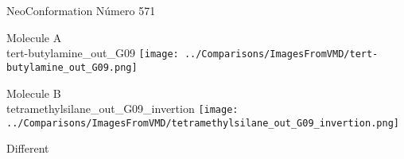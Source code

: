  \newpage

\vtab[-3cm]
\begin{center}
{\large NeoConformation \tab Número 571}
\end{center}
\begin{multicols}{2}
\begin{center}
Molecule A \\ 
tert-butylamine\_out\_G09
\texttt{[image: ../Comparisons/ImagesFromVMD/tert-butylamine\_out\_G09.png]}
\\
\vtab

\columnbreak
Molecule B \\ 
tetramethylsilane\_out\_G09\_invertion
\texttt{[image: ../Comparisons/ImagesFromVMD/tetramethylsilane\_out\_G09\_invertion.png]}
\\
\vtab


\end{center}
\end{multicols}
\begin{center}
\textcolor{NavyBlue}{\Large Different}
\end{center}

 \newpage

